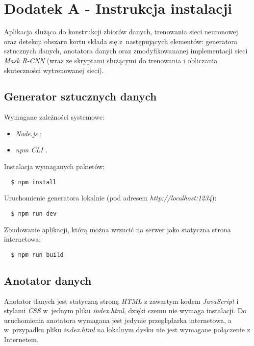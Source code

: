 \chapter*{Dodatek A - Instrukcja instalacji}
\label{sec:instrukcja-instalacji}

Aplikacja służąca do konstrukcji zbiorów danych, trenowania sieci neuronowej oraz detekcji obszaru kortu składa się z~następujących elementów: generatora sztucznych danych, anotatora danych oraz zmodyfikowananej implementacji sieci \textit{Mask R-CNN} \cite{matterport-mask-rcnn} (wraz ze skryptami służącymi do trenowania i obliczania skuteczności wytrenowanej sieci).

\section*{Generator sztucznych danych}

Wymagane zależności systemowe:

\begin{itemize}
  \item \textit{Node.js} \cite{nodejs};
  \item \textit{npm CLI} \cite{npm}.
\end{itemize}

Instalacja wymaganych pakietów:

\begin{verbatim}
  $ npm install
\end{verbatim}

Uruchomienie generatora lokalnie (pod adresem \textit{http://localhost:1234}):

\begin{verbatim}
  $ npm run dev
\end{verbatim}

Zbudowanie aplikacji, którą można wrzucić na serwer jako statyczna strona internetowa:

\begin{verbatim}
  $ npm run build
\end{verbatim}

\section*{Anotator danych}
Anotator danych jest statyczną stroną \textit{HTML} z zawartym kodem \textit{JavaScript} i stylami \textit{CSS} w~jednym pliku \textit{index.html}, dzięki czemu nie wymaga instalacji. Do uruchomienia anotatora wymagana jest jedynie przeglądarka internetowa, a w~przypadku pliku \textit{index.html} na lokalnym dysku nie jest wymagane połączenie z Internetem.

